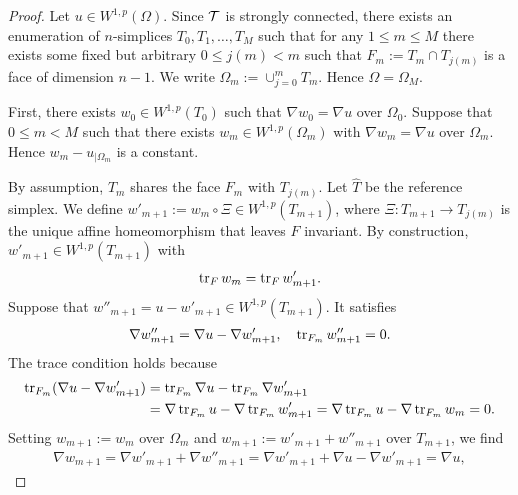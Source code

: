 \documentclass[a4paper]{article}
\begin{document}
\begin{proof}
    Let $u \in W^{1,p}(\Omega)$. 
    Since ${\mathcal T}$ is strongly connected, there exists an enumeration of $n$-simplices $T_0, T_1, \dots, T_M$ such that for any $1 \leq m \leq M$ there exists some fixed but arbitrary $0 \leq j(m) < m$ such that $F_m := T_m \cap T_{j(m)}$ is a face of dimension $n-1$. 
    We write $\Omega_m := \cup_{j=0}^{m} T_m$. Hence $\Omega = \Omega_M$. 
    
    First, there exists $w_0 \in W^{1,p}(T_{0})$ such that $\nabla w_{0} = \nabla u$ over $\Omega_0$. 
    Suppose that $0 \leq m < M$ such that there exists $w_{m} \in W^{1,p}(\Omega_{m})$ with $\nabla w_{m} = \nabla u$ over $\Omega_m$. 
    Hence $w_{m} - u_{|\Omega_{m}}$ is a constant. 
    
    By assumption, $T_{m}$ shares the face $F_{m}$ with $T_{j(m)}$. 
    Let $\hat T$ be the reference simplex.
    We define $w'_{m+1} := w_{m} \circ \Xi \in W^{1,p}(T_{m+1})$,
    where $\Xi : T_{m+1} \rightarrow T_{j(m)}$ is the unique affine homeomorphism that leaves $F$ invariant. 
    By construction, $w'_{m+1} \in W^{1,p}(T_{m+1})$ with 
    \begin{align*}
        \operatorname{tr}_F w_{m} = \operatorname{tr}_F w'_{m+1}
        .
    \end{align*}
    Suppose that $w''_{m+1} = u - w'_{m+1} \in W^{1,p}(T_{m+1})$.
    It satisfies 
    \begin{align*}
        \nabla w''_{m+1} = \nabla u - \nabla w'_{m+1}, 
        \quad 
        \operatorname{tr}_{F_{m}} w''_{m+1} = 0.
    \end{align*}
    The trace condition holds because 
    \begin{align*}
        \operatorname{tr}_{F_{m}}( \nabla u - \nabla w'_{m+1} ) 
        &= 
        \operatorname{tr}_{F_{m}} \nabla u - \operatorname{tr}_{F_{m}} \nabla w'_{m+1}
        \\&= 
        \nabla \operatorname{tr}_{F_{m}} u - \nabla \operatorname{tr}_{F_{m}} w'_{m+1}
        = 
        \nabla \operatorname{tr}_{F_{m}} u - \nabla \operatorname{tr}_{F_{m}} w_{m}
        = 
        0
        .
    \end{align*}
    Setting $w_{m+1} := w_{m}$ over $\Omega_{m}$ and $w_{m+1} := w'_{m+1} + w''_{m+1}$ over $T_{m+1}$, 
    we find 
    \begin{gather*}
        \nabla w_{m+1} = \nabla w'_{m+1} + \nabla w''_{m+1} = \nabla w'_{m+1} + \nabla u - \nabla w'_{m+1} = \nabla u,

\end{gather*}
\end{proof}
\end{document}

